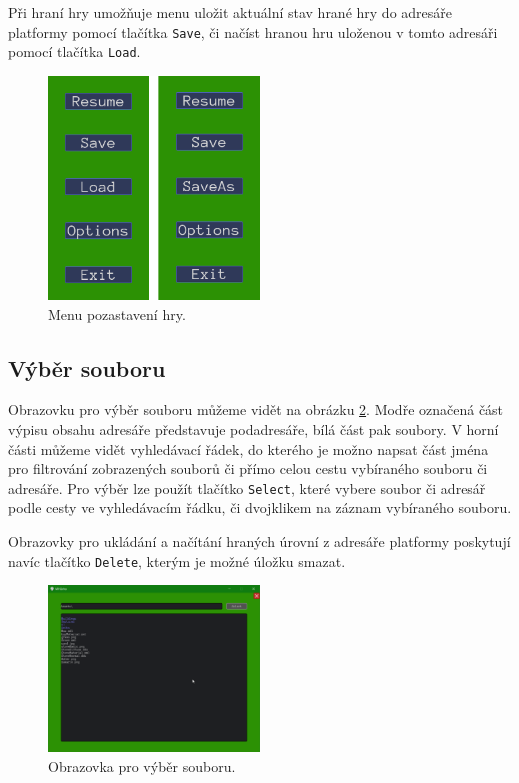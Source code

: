 Při hraní hry umožňuje menu uložit aktuální stav hrané hry do adresáře platformy pomocí tlačítka \texttt{Save}, či načíst hranou hru uloženou v tomto adresáři pomocí tlačítka \texttt{Load}.

\begin{figure}[h]
	\centering
	\includegraphics[width=0.5\textwidth]{img/PauseMenuComparison.png}
	\caption{Menu pozastavení hry.}
	\label{fig:pauseMenu}
\end{figure}


\subsection{Výběr souboru}
Obrazovku pro výběr souboru můžeme vidět na obrázku \ref{fig:filepicking}. Modře označená část výpisu obsahu adresáře představuje podadresáře, bílá část pak soubory. V horní části můžeme vidět vyhledávací řádek, do kterého je možno napsat část jména pro filtrování zobrazených souborů či přímo celou cestu vybíraného souboru či adresáře. Pro výběr lze použít tlačítko \texttt{Select}, které vybere soubor či adresář podle cesty ve vyhledávacím řádku, či dvojklikem na záznam vybíraného souboru.

Obrazovky pro ukládání a načítání hraných úrovní z adresáře platformy poskytují navíc tlačítko \texttt{Delete}, kterým je možné úložku smazat.

\begin{figure}[h]
	\centering
	\includegraphics[width=0.5\textwidth]{img/FilePickingScreen.png}
	\caption{Obrazovka pro výběr souboru.}
	\label{fig:filepicking}
\end{figure}

